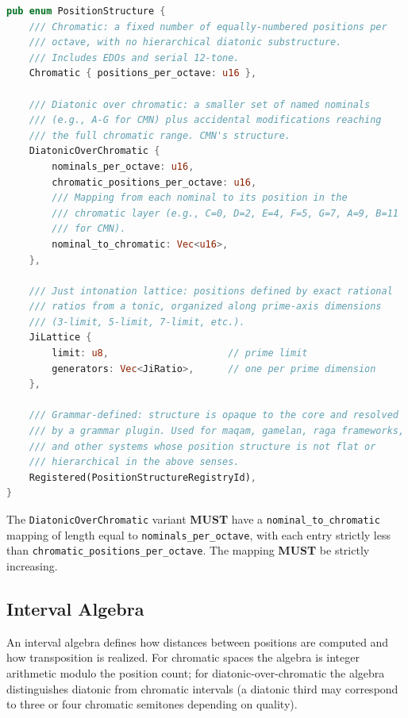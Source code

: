 \documentclass[11pt,letterpaper]{report}
\newcounter{requirement}[chapter]
\newcommand{\MUST}{\textbf{MUST}}
\begin{document}
\begin{lstlisting}[language=Rust]
pub enum PositionStructure {
    /// Chromatic: a fixed number of equally-numbered positions per
    /// octave, with no hierarchical diatonic substructure.
    /// Includes EDOs and serial 12-tone.
    Chromatic { positions_per_octave: u16 },

    /// Diatonic over chromatic: a smaller set of named nominals
    /// (e.g., A-G for CMN) plus accidental modifications reaching
    /// the full chromatic range. CMN's structure.
    DiatonicOverChromatic {
        nominals_per_octave: u16,
        chromatic_positions_per_octave: u16,
        /// Mapping from each nominal to its position in the
        /// chromatic layer (e.g., C=0, D=2, E=4, F=5, G=7, A=9, B=11
        /// for CMN).
        nominal_to_chromatic: Vec<u16>,
    },

    /// Just intonation lattice: positions defined by exact rational
    /// ratios from a tonic, organized along prime-axis dimensions
    /// (3-limit, 5-limit, 7-limit, etc.).
    JiLattice {
        limit: u8,                     // prime limit
        generators: Vec<JiRatio>,      // one per prime dimension
    },

    /// Grammar-defined: structure is opaque to the core and resolved
    /// by a grammar plugin. Used for maqam, gamelan, raga frameworks,
    /// and other systems whose position structure is not flat or
    /// hierarchical in the above senses.
    Registered(PositionStructureRegistryId),
}
\end{lstlisting}

\begin{requirement}
  \label{req:tuning:diatonic-chromatic-mapping}
  The \texttt{DiatonicOverChromatic} variant \MUST{} have a
  \texttt{nominal\_to\_chromatic} mapping of length equal to
  \texttt{nominals\_per\_octave}, with each entry strictly less than
  \texttt{chromatic\_positions\_per\_octave}. The mapping \MUST{} be
  strictly increasing.
\end{requirement}

\subsection{Interval Algebra}

An interval algebra defines how distances between positions are
computed and how transposition is realized. For chromatic spaces the
algebra is integer arithmetic modulo the position count; for
diatonic-over-chromatic the algebra distinguishes diatonic from
chromatic intervals (a diatonic third may correspond to three or four
chromatic semitones depending on quality).
\end{document}
